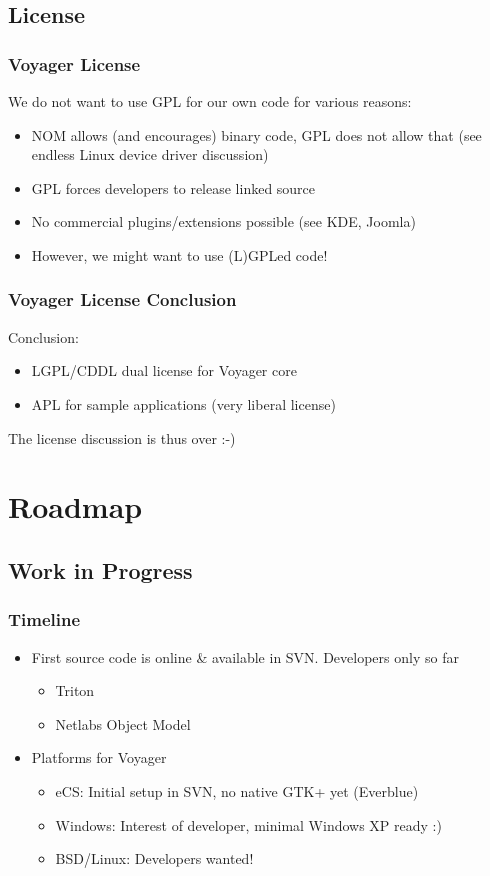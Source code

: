 \documentclass{beamer}
\begin{document}
\subsection{License}

\begin{frame}
\frametitle{Voyager License}
We do not want to use GPL for our own code for various reasons:
\begin{itemize}[<+->]
  \item NOM allows (and encourages) binary code, GPL does not allow
  that (see endless Linux device driver discussion)
  \item GPL forces developers to release linked source
  \item No commercial plugins/extensions possible (see KDE, Joomla)
  \item However, we might want to use (L)GPLed code!
\end{itemize}
\end{frame}
\begin{frame}
\frametitle{Voyager License Conclusion}
Conclusion:
\begin{itemize}[<+->]
  \item LGPL/CDDL dual license for Voyager core
  \item APL for sample applications (very liberal license)
\end{itemize}
The license discussion is thus over :-)
\end{frame}

\section{Roadmap}
\subsection{Work in Progress}

\begin{frame}[allowframebreaks]
\frametitle{Timeline}
\begin{itemize}
  \item First source code is online & available in SVN. Developers only so far
  \begin{itemize}
    \item Triton
    \item Netlabs Object Model
  \end{itemize}
  \item Platforms for Voyager
  \begin{itemize}
    \item eCS: Initial setup in SVN, no native GTK+ yet (Everblue)
  	\item Windows: Interest of developer, minimal Windows XP ready :)
  	\item BSD/Linux: Developers wanted!
  \end{itemize}
\end{itemize}
\end{frame}
\end{document}
